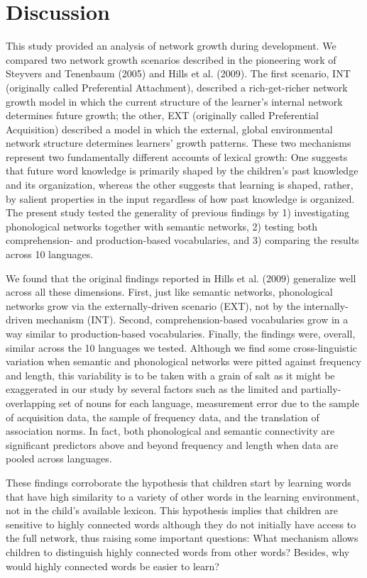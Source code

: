 \documentclass[english,floatsintext,man]{apa6}
\theoremstyle{definition}
\theoremstyle{definition}
\theoremstyle{definition}
\theoremstyle{remark}
\begin{document}
\section{Discussion}\label{discussion}

This study provided an analysis of network growth during development. We
compared two network growth scenarios described in the pioneering work
of Steyvers and Tenenbaum (2005) and Hills et al. (2009). The first
scenario, INT (originally called Preferential Attachment), described a
rich-get-richer network growth model in which the current structure of
the learner's internal network determines future growth; the other, EXT
(originally called Preferential Acquisition) described a model in which
the external, global environmental network structure determines
learners' growth patterns. These two mechanisms represent two
fundamentally different accounts of lexical growth: One suggests that
future word knowledge is primarily shaped by the children's past
knowledge and its organization, whereas the other suggests that learning
is shaped, rather, by salient properties in the input regardless of how
past knowledge is organized. The present study tested the generality of
previous findings by 1) investigating phonological networks together
with semantic networks, 2) testing both comprehension- and
production-based vocabularies, and 3) comparing the results across 10
languages.

We found that the original findings reported in Hills et al. (2009)
generalize well across all these dimensions. First, just like semantic
networks, phonological networks grow via the externally-driven scenario
(EXT), not by the internally-driven mechanism (INT). Second,
comprehension-based vocabularies grow in a way similar to
production-based vocabularies. Finally, the findings were, overall,
similar across the 10 languages we tested. Although we find some
cross-linguistic variation when semantic and phonological networks were
pitted against frequency and length, this variability is to be taken
with a grain of salt as it might be exaggerated in our study by several
factors such as the limited and partially-overlapping set of nouns for
each language, measurement error due to the sample of acquisition data,
the sample of frequency data, and the translation of association norms.
In fact, both phonological and semantic connectivity are significant
predictors above and beyond frequency and length when data are pooled
across languages.

These findings corroborate the hypothesis that children start by
learning words that have high similarity to a variety of other words in
the learning environment, not in the child's available lexicon. This
hypothesis implies that children are sensitive to highly connected words
although they do not initially have access to the full network, thus
raising some important questions: What mechanism allows children to
distinguish highly connected words from other words? Besides, why would
highly connected words be easier to learn?
\end{document}
